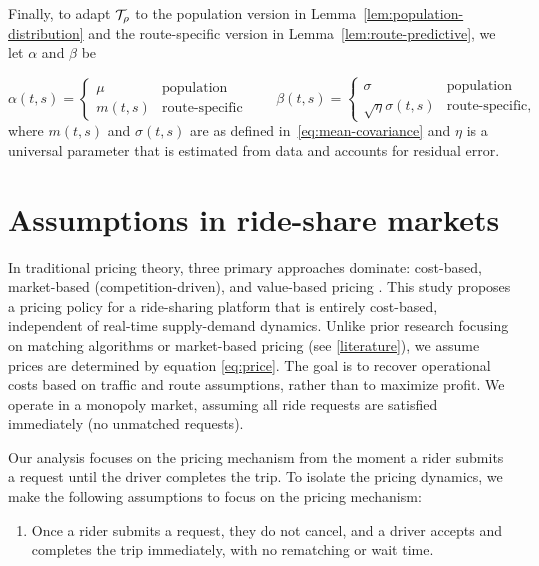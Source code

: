 \documentclass[12pt]{article}
\begin{document}
{{{{{Finally, to adapt $\mathcal{T}_\rho$ to the population version in Lemma~\ref{lem:population-distribution} and the route-specific version in Lemma~\ref{lem:route-predictive}, we let $\alpha$ and $\beta$ be 

\begin{equation}\label{eq:mean-variance-sde}
    \alpha(t,s) = 
    \begin{cases}
        \mu & \text{population} \\
        m(t,s) & \text{route-specific}
    \end{cases}
    \qquad 
    \beta(t,s) = 
    \begin{cases}
        \sigma & \text{population}        \\
        \sqrt{\eta}\sigma(t,s) & \text{route-specific},
    \end{cases}
\end{equation}
where $m(t,s)$ and $\sigma(t,s)$ are as defined in~\eqref{eq:mean-covariance} and $\eta$ is a universal parameter that is estimated from data and accounts for residual error. 


\section{Assumptions in ride-share markets}\label{sec:assumptions}
In traditional pricing theory, three primary approaches dominate: cost-based, market-based (competition-driven), and value-based pricing \cite{phillips2021pricing}. This study proposes a pricing policy for a ride-sharing platform that is entirely cost-based, independent of real-time supply-demand dynamics. Unlike prior research focusing on matching algorithms or market-based pricing (see \ref{literature}), we assume prices are determined by equation \eqref{eq:price}. The goal is to recover operational costs based on traffic and route assumptions, rather than to maximize profit. We operate in a monopoly market, assuming all ride requests are satisfied immediately (no unmatched requests).


Our analysis focuses on the pricing mechanism from the moment a rider submits a request until the driver completes the trip. To isolate the pricing dynamics, we make the following   assumptions to focus  on the pricing mechanism:
\begin{enumerate}[label={(A$_{\arabic*}$)}, ref={(A$_{\arabic*}$)}]  
	\label{monopoly}
	\item Once a rider submits a request, they do not cancel, and a driver accepts and completes the trip immediately, with no rematching or wait time.
	

\end{enumerate}}}}}}
\end{document}
